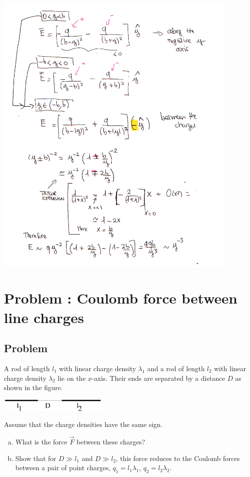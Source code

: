 \documentclass[solutions]{esg8022pset}
\begin{document}
  \begin{center}\includegraphics[width=0.9\textwidth]{ps01_sol_07_2_hand}\end{center}
\section{Problem \thesection: Coulomb force between line charges}
\subsection{Problem}
  A rod of length $l_1$ with linear charge density $\lambda_1$ and a rod of length $l_2$ with linear charge density $\lambda_2$ lie on the $x$-axis.  Their ends are separated by a distance $D$ as shown in the figure.
  \begin{center}\includegraphics[width=0.4\textwidth]{ps01_9}\end{center}
  Assume that the charge densities have the same sign.
  \begin{enumerate}[(a)]
    \item What is the force $\vec F$ between these charges?
    \item Show that for $D \gg l_1$ and $D \gg l_2$, this force reduces to the Coulomb forces between a pair of point charges, $q_1 = l_1\lambda_1$, $q_2 = l_2\lambda_2$.
  \end{enumerate}
\end{document}
